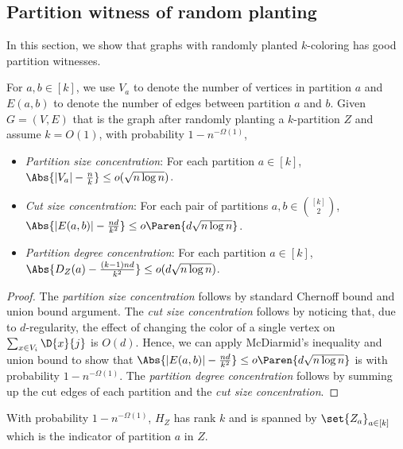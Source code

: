 \subsection{Partition witness of random planting}

In this section, we show that graphs with randomly planted $k$-coloring has good partition witnesses.

\begin{lemma}
\label{lem:random_planting_concentration}
    For $a, b \in [k]$, we use $V_a$ to denote the number of vertices in partition $a$ and $E(a, b)$ to denote the number of edges between partition $a$ and $b$. Given $G=(V, E)$ that is the graph after randomly planting a $k$-partition $Z$ and assume $k = O(1)$, with probability $1-n^{-\Omega(1)}$,
    \begin{itemize}
        \item \emph{Partition size concentration}: For each partition $a \in [k]$, $\Abs{|V_a| - \frac{n}{k}} \leq o(\sqrt{n \log n})$.
        \item \emph{Cut size concentration}: For each pair of partitions $a, b \in \binom{[k]}{2}$, $\Abs{|E(a, b)| - \frac{nd}{k^2}} \leq o \Paren{d \sqrt{n \log n}}$.
        \item \emph{Partition degree concentration}: For each partition $a \in [k]$, $\Abs{D_Z(a) - \frac{(k-1)nd}{k^2}} \leq o(d \sqrt{n \log n})$.
    \end{itemize}
\end{lemma}

\begin{proof}
    The \emph{partition size concentration} follows by standard Chernoff bound and union bound argument. The \emph{cut size concentration} follows by noticing that, due to $d$-regularity, the effect of changing the color of a single vertex on $\sum_{x\in V_i} \D{x}{j}$ is $O(d)$. Hence, we can apply McDiarmid's inequality and union bound to show that $\Abs{|E(a, b)| - \frac{nd}{k^2}} \leq o \Paren{d \sqrt{n \log n}}$ is with probability $1-n^{-\Omega(1)}$. The \emph{partition degree concentration} follows by summing up the cut edges of each partition and the \emph{cut size concentration}.
\end{proof}

\begin{lemma}
\label{lem:random_planting_partition_spanning}
    With probability $1-n^{-\Omega(1)}$, $H_Z$ has rank $k$ and is spanned by $\set{Z_a}_{a \in [k]}$ which is the indicator of partition $a$ in $Z$.
\end{lemma}

